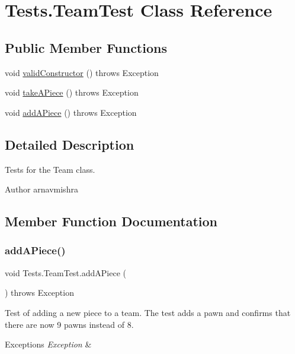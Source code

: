 \hypertarget{class_tests_1_1_team_test}{}\section{Tests.\+Team\+Test Class Reference}
\label{class_tests_1_1_team_test}
\subsection*{Public Member Functions}
\begin{DoxyCompactItemize}
\item 
void \hyperlink{class_tests_1_1_team_test_a2e81c6940e0a7ed7ec9f05ea4d0799d7}{valid\+Constructor} ()  throws Exception 
\item 
void \hyperlink{class_tests_1_1_team_test_a7cb853699e49ed8f2cb52056fba9be1e}{take\+A\+Piece} ()  throws Exception 
\item 
void \hyperlink{class_tests_1_1_team_test_a7a58d153f2570b724ee30b0281387739}{add\+A\+Piece} ()  throws Exception 
\end{DoxyCompactItemize}


\subsection{Detailed Description}
Tests for the Team class. \begin{DoxyAuthor}{Author}
arnavmishra 
\end{DoxyAuthor}


\subsection{Member Function Documentation}
\hypertarget{class_tests_1_1_team_test_a7a58d153f2570b724ee30b0281387739}{}\label{class_tests_1_1_team_test_a7a58d153f2570b724ee30b0281387739} 
\subsubsection{\texorpdfstring{add\+A\+Piece()}{addAPiece()}}
{\footnotesize\ttfamily void Tests.\+Team\+Test.\+add\+A\+Piece (\begin{DoxyParamCaption}{ }\end{DoxyParamCaption}) throws Exception}

Test of adding a new piece to a team. The test adds a pawn and confirms that there are now 9 pawns instead of 8. 
\begin{DoxyExceptions}{Exceptions}
{\em Exception} & \\
\hline
\end{DoxyExceptions}
\hypertarget{class_tests_1_1_team_test_a7cb853699e49ed8f2cb52056fba9be1e}{}\label{class_tests_1_1_team_test_a7cb853699e49ed8f2cb52056fba9be1e} 
